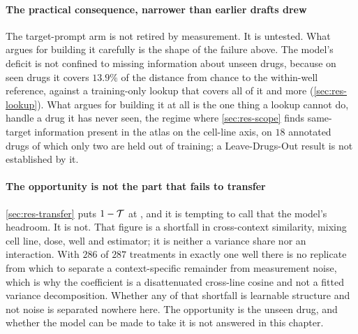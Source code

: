 \paragraph{The practical consequence, narrower than earlier drafts drew} The
target-prompt arm is not retired by measurement. It is untested. What argues for
building it carefully is the shape of the failure above. The model's deficit is
not confined to missing information about unseen drugs, because on seen drugs it
covers $13.9\%$ of the distance from chance to the within-well reference, against
a training-only lookup that covers all of it and more (\cref{sec:res-lookup}).
What argues for building it at all is the one thing a lookup cannot do, handle a
drug it has never seen, the regime where \cref{sec:res-scope} finds same-target information present in the atlas on the cell-line axis, on $18$ annotated drugs of which only two are held out of training; a Leave-Drugs-Out result is not established by it.

\paragraph{The opportunity is not the part that fails to transfer}
\cref{sec:res-transfer} puts $1 - \mathcal{T}$ at , and it
is tempting to call that the model's headroom. It is not. That figure is a
shortfall in cross-context similarity, mixing cell line, dose, well and
estimator; it is neither a variance share nor an interaction. With $286$ of $287$
treatments in exactly one well there is no replicate from which to separate a
context-specific remainder from measurement noise, which is why the coefficient
is a disattenuated cross-line cosine and not a fitted variance
decomposition. Whether any of that shortfall is learnable structure and not noise is
separated nowhere here. The opportunity is the unseen drug, and whether the model
can be made to take it is not answered in this chapter.

